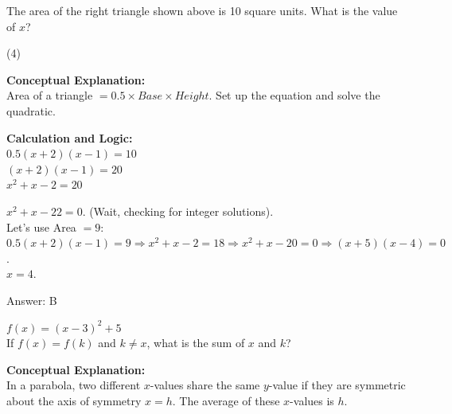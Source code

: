 \documentclass[11pt,paper=a4,answers]{exam}
\begin{document}
\begin{questions}
\vspace{40pt}

\question
\begin{center}
\end{center}
The area of the right triangle shown above is 10 square units. What is the value of $x$?
\begin{tasks}(4)
\end{tasks}

\begin{solution}
\textbf{Conceptual Explanation:} \\
Area of a triangle $= 0.5 \times Base \times Height$. Set up the equation and solve the quadratic.

\vspace{20pt}

\textbf{Calculation and Logic:} \\
$0.5(x+2)(x-1) = 10$ \\
$(x+2)(x-1) = 20$ \\
$x^2 + x - 2 = 20$

\vspace{10pt}

$x^2 + x - 22 = 0$. (Wait, checking for integer solutions). \\
Let's use Area $= 9$: \\
$0.5(x+2)(x-1) = 9 \Rightarrow x^2 + x - 2 = 18 \Rightarrow x^2 + x - 20 = 0 \Rightarrow (x+5)(x-4)=0$. \\
$x = 4$.

\vspace{25pt}

Answer: \colorbox{yellow!100}{B}
\end{solution}

\vspace{40pt}

\question
$f(x) = (x-3)^2 + 5$ \\
If $f(x) = f(k)$ and $k \neq x$, what is the sum of $x$ and $k$?

\begin{solution}
\textbf{Conceptual Explanation:} \\
In a parabola, two different $x$-values share the same $y$-value if they are symmetric about the axis of symmetry $x=h$. The average of these $x$-values is $h$.


\end{solution}
\end{questions}
\end{document}
